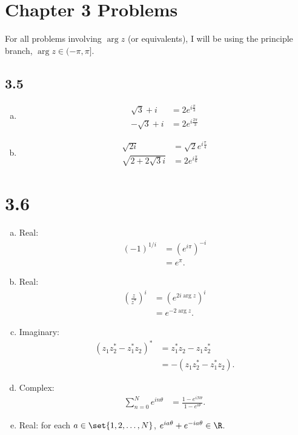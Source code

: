 \documentclass[10pt]{mypackage}
\begin{document}
\section{Chapter 3 Problems}%
For all problems involving $\arg z$ (or equivalents), I will be using the principle branch, $\arg z \in (-\pi,\pi]$.
\subsection{3.5}%
\begin{enumerate}[(a)]
  \item
    \begin{align*}
      \sqrt{3} + i &= 2e^{i\frac{\pi}{3}}\\
      -\sqrt{3} + i &= 2e^{i\frac{2\pi}{3}}
    \end{align*}
  \item 
    \begin{align*}
      \sqrt{2i} &= \sqrt{2}e^{i \frac{\pi}{4}}\\
      \sqrt{2 + 2\sqrt{3}i} &= 2e^{i \frac{\pi}{6}}
    \end{align*}
\end{enumerate}
\section{3.6}%
\begin{enumerate}[(a)]
  \item Real:
    \begin{align*}
      \left(-1\right)^{1/i} &= \left(e^{i\pi}\right)^{-i}\\
                            &= e^{\pi}.
    \end{align*}
  \item Real:
    \begin{align*}
      \left(\frac{z}{z^{\ast}}\right)^{i} &= \left(e^{2i\arg z}\right)^{i}\\
                                          &= e^{-2\arg z}.
    \end{align*}
  \item Imaginary:
    \begin{align*}
      \left(z_1z_2^{\ast} - z_1^{\ast}z_2\right)^{\ast}&= z_1^{\ast}z_2 - z_1z_2^{\ast}\\
                                                       &= -\left(z_1z_2^{\ast} - z_1^{\ast}z_2\right).
    \end{align*}
  \item Complex: 
    \begin{align*}
      \sum_{n=0}^{N}e^{in\theta} &= \frac{1 - e^{iN\theta}}{1 - e^{i\theta}}.
    \end{align*}
  \item Real: for each $a\in \set{1,2,\dots,N}$, $e^{ia\theta} + e^{-ia\theta} \in \R$.
\end{enumerate}
\end{document}
